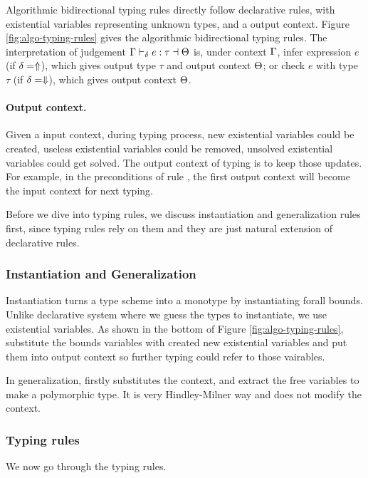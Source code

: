Algorithmic bidirectional typing rules directly follow declarative rules, with existential variables representing unknown types, and a output context. Figure \ref{fig:algo-typing-rules} gives the algorithmic bidirectional typing rules. The interpretation of judgement $\tpreall e:\tau \toctx \trto t$ is, under context $\tctx$, infer expression $e$ (if $\delta = \Inf$), which gives output type $\tau$ and output context $\ctxl$; or check $e$ with type $\tau$ (if $\delta = \Chk$), which gives output context $\ctxl$.

\paragraph{Output context.}
Given a input context, during typing process, new existential variables could be created, useless existential variables could be removed, unsolved existential variables could get solved. The output context of typing is to keep those updates. For example, in the preconditions of rule , the first output context will become the input context for next typing.

Before we dive into typing rules, we discuss instantiation and generalization rules first, since typing rules rely on them and they are just natural extension of declarative rules.

\subsubsection{Instantiation and Generalization}

Instantiation turns a type scheme into a monotype by instantiating forall bounds. Unlike declarative system where we guess the types to instantiate, we use existential variables. As shown in the bottom of Figure \ref{fig:algo-typing-rules},  substitute the bounds variables with created new existential variables and put them into output context so further typing could refer to those vairables.

In generalization,  firstly substitutes the context, and extract the free variables to make a polymorphic type. It is very Hindley-Milner way and does not modify the context.

\subsubsection{Typing rules}

We now go through the typing rules.

